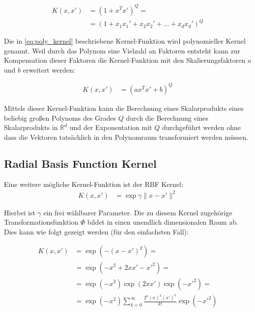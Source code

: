 \documentclass[a4paper,11pt,twoside]{scrreprt}
\newcommand{\norm}[1]{\lVert#1\rVert}
\begin{document}
\begin{equation} \label{eq:poly_kernel}
	\begin{aligned}
		K(x, x') &= (1 + x^{T}x')^{Q} = \\
		&= (1 + x_{1} x_{1}' + x_{2} x_{2}' + \dots + x_{d} x_{d}')^{Q}
	\end{aligned}
\end{equation}

Die in \autoref{eq:poly_kernel} beschriebene Kernel-Funktion wird polynomieller Kernel genannt. Weil durch das Polynom eine Vielzahl an Faktoren entsteht kann zur Kompensation dieser Faktoren die Kernel-Funktion mit den Skalierungsfaktoren $a$ und $b$ erweitert werden:

  \begin{equation} \label{eq:poly_kernel2}
  	\begin{aligned}
  		K(x, x') &= (a x^{T}x' + b)^{Q}
  	\end{aligned}
  \end{equation}

Mittels dieser Kernel-Funktion kann die Berechnung eines Skalarprodukts eines beliebig großen Polynoms des Grades $Q$ durch die Berechnung eines Skalarprodukts in $\mathbb{R}^{d}$ und der Exponentation mit $Q$ durchgeführt werden ohne dass die Vektoren tatsächlich in den Polynomraum transformiert werden müssen.  

\subsection{Radial Basis Function Kernel}

Eine weitere mögliche Kernel-Funktion ist der \ac{RBF} Kernel:
\begin{equation} \label{eq:rbfk}
	\begin{aligned}
		K(x, x') &= \exp{\gamma \norm{x - x'}^2}
	\end{aligned}
\end{equation}

Hierbei ist $\gamma$ ein frei wählbarer Parameter.
Die zu diesem Kernel zugehörige Transformationsfunktion $\Phi$ bildet in einen unendlich dimensionalen Raum ab.
Dies kann wie folgt gezeigt werden (für den einfachsten Fall):

\begin{equation} \label{eq:proof_rbfk_infinite}
	\begin{aligned}
		K(x, x') &= \exp{(-(x - x')^{2})} =\\
		&= \exp{(-x^{2} + 2xx' - x'^{2})} = \\
		&= \exp{(-x^{2})} \exp{(2xx')} \exp{(-x'^{2})} = \\
		&= \exp{(-x^{2})} \sum_{k=0}^{\infty} \frac{2^{k} (x)^{k} (x')^{k}}{k!} \exp{(-x'^{2})}
	\end{aligned}
\end{equation}
\end{document}

